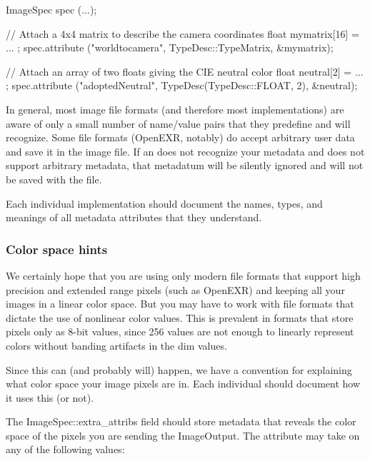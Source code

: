 \begin{code}
        ImageSpec spec (...);

        // Attach a 4x4 matrix to describe the camera coordinates
        float mymatrix[16] = { ... };
        spec.attribute ("worldtocamera", TypeDesc::TypeMatrix, &mymatrix);

        // Attach an array of two floats giving the CIE neutral color
        float neutral[2] = { ... };
        spec.attribute ("adoptedNeutral", TypeDesc(TypeDesc::FLOAT, 2), &neutral);
\end{code}

In general, most image file formats (and therefore most \ImageOutput
implementations) are aware of only a small number of name/value pairs
that they predefine and will recognize.  Some file formats (OpenEXR,
notably) do accept arbitrary user data and save it in the image file.
If an \ImageOutput does not recognize your metadata and does not support
arbitrary metadata, that metadatum will be silently ignored and will not
be saved with the file.

Each individual \ImageOutput implementation should document the names,
types, and meanings of all metadata attributes that they understand.


\subsubsection{Color space hints}

We certainly hope that you are using only modern file formats that
support high precision and extended range pixels (such as OpenEXR) and
keeping all your images in a linear color space.  But you may have to
work with file formats that dictate the use of nonlinear color values.
This is prevalent in formats that store pixels only as 8-bit values,
since 256 values are not enough to linearly represent colors without
banding artifacts in the dim values.

Since this can (and probably will) happen, we have a convention
for explaining what color space your image pixels are
in.  Each individual \ImageOutput should document how it uses this (or
not).

The {\cf ImageSpec::extra_attribs} field should store metadata that
reveals the color space of the pixels you are sending the ImageOutput.
The  attribute may take on any of the following
values:

